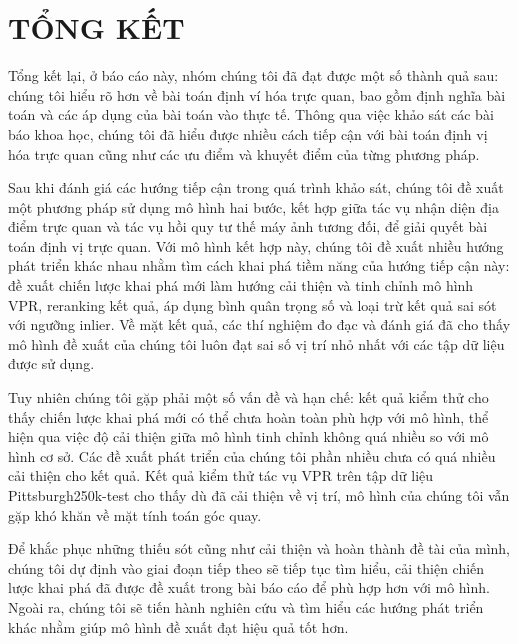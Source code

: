 \chapter{TỔNG KẾT}

Tổng kết lại, ở báo cáo này, nhóm chúng tôi đã đạt được một số thành quả sau: chúng tôi hiểu rõ hơn về bài toán định ví hóa trực quan, bao gồm định nghĩa bài toán và các áp dụng của bài toán vào thực tế. Thông qua việc khảo sát các bài báo khoa học, chúng tôi đã hiểu được nhiều cách tiếp cận với bài toán định vị hóa trực quan cũng như các ưu điểm và khuyết điểm của từng phương pháp. 

Sau khi đánh giá các hướng tiếp cận trong quá trình khảo sát, chúng tôi đề xuất một phương pháp sử dụng mô hình hai bước, kết hợp giữa tác vụ nhận diện địa điểm trực quan và tác vụ hồi quy tư thế máy ảnh tương đối, để giải quyết bài toán định vị trực quan. Với mô hình kết hợp này, chúng tôi đề xuất nhiều hướng phát triển khác nhau nhằm tìm cách khai phá tiềm năng của hướng tiếp cận này: đề xuất chiến lược khai phá mới làm hướng cải thiện và tinh chỉnh mô hình VPR, reranking kết quả, áp dụng bình quân trọng số và loại trừ kết quả sai sót với ngưỡng inlier. Về mặt kết quả, các thí nghiệm đo đạc và đánh giá đã cho thấy mô hình đề xuất của chúng tôi luôn đạt sai số vị trí nhỏ nhất với các tập dữ liệu được sử dụng.

Tuy nhiên chúng tôi gặp phải một số vấn đề và hạn chế: kết quả kiểm thử cho thấy chiến lược khai phá mới có thể chưa hoàn toàn phù hợp với mô hình, thể hiện qua việc độ cải thiện giữa mô hình tinh chỉnh không quá nhiều so với mô hình cơ sở. Các đề xuất phát triển của chúng tôi phần nhiều chưa có quá nhiều cải thiện cho kết quả. Kết quả kiểm thử tác vụ VPR trên tập dữ liệu Pittsburgh250k-test cho thấy dù đã cải thiện về vị trí, mô hình của chúng tôi vẫn gặp khó khăn về mặt tính toán góc quay.

Để khắc phục những thiếu sót cũng như cải thiện và hoàn thành đề tài của mình, chúng tôi dự định vào giai đoạn tiếp theo sẽ tiếp tục tìm hiểu, cải thiện chiến lược khai phá đã được đề xuất trong bài báo cáo để phù hợp hơn với mô hình. Ngoài ra, chúng tôi sẽ tiến hành nghiên cứu và tìm hiểu các hướng phát triển khác nhằm giúp mô hình đề xuất đạt hiệu quả tốt hơn.
